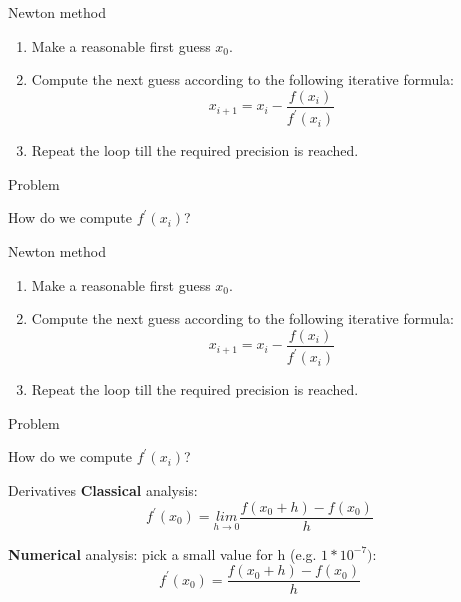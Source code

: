 \documentclass[xcolor={dvipsnames,rgb}, aspectratio=169]{beamer}
\begin{document}
\begin{frame}{Newton method}
   \begin{enumerate}
      \item Make a reasonable first guess $x_{0}$.
      \item Compute the next guess according to the following iterative formula:
         \begin{equation*}
            x_{i+1} = x_{i} - \frac{f(x_{i})}{f^{'}(x_{i})}
         \end{equation*}
      \item Repeat the loop till the required precision is reached.
   \end{enumerate}
   \centering
   \alert{Problem}

   How do we compute $f^{'}(x_{i})$?
\end{frame}

\begin{frame}{Newton method}
   \begin{enumerate}
      \item Make a reasonable first guess $x_{0}$.
      \item Compute the next guess according to the following iterative formula:
         \begin{equation*}
            x_{i+1} = x_{i} - \frac{f(x_{i})}{f^{'}(x_{i})}
         \end{equation*}
      \item Repeat the loop till the required precision is reached.
   \end{enumerate}
   \centering
   \alert{Problem}

   How do we compute $f^{'}(x_{i})$?
\end{frame}

\begin{frame}{Derivatives}
   \textbf{Classical} analysis:
      \begin{equation*}
         f^{'}(x_{0}) = \underset{h \longrightarrow 0}{lim}\frac{f(x_{0} + h) - f(x_{0})}{h}
      \end{equation*}

   \textbf{Numerical} analysis: pick a small value for h (e.g. $1*10^{-7})$:
   \begin{equation*}
      f^{'}(x_{0}) = \frac{f(x_{0} + h) - f(x_{0})}{h}
   \end{equation*}
\end{frame}
\end{document}
